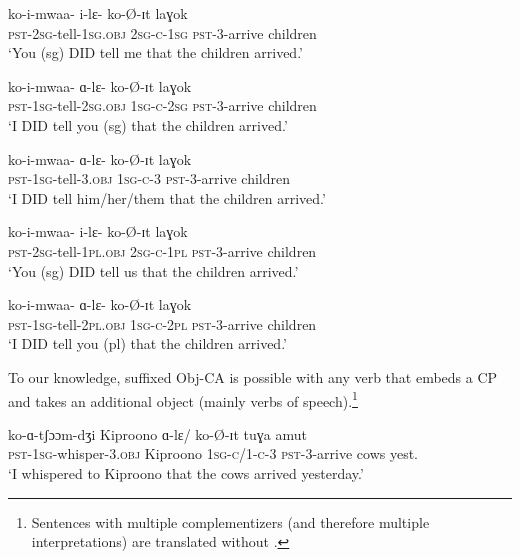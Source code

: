 \documentclass[output=paper
,newtxmath
,modfonts
,nonflat]{langsci/langscibook}
\begin{document}
\ea \label{Obj CA Examples} 
\begin{xlist}

\ex \gll ko-i-mwaa- i-lɛ- ko-\O-ɪt laɣok \\
\textsc{pst}-2\textsc{sg}-tell-1\textsc{sg}.\textsc{obj} 2\textsc{sg-c-}1\textsc{sg} \textsc{pst}-3-arrive children \\ 
\glt `You (sg) DID tell me that the children arrived.'

\ex \gll ko-i-mwaa- ɑ-lɛ- ko-\O-ɪt laɣok \\
\textsc{pst}-1\textsc{sg}-tell-2\textsc{sg}.\textsc{obj} 1\textsc{sg-c-}2\textsc{sg} \textsc{pst}-3-arrive children \\
\glt `I DID tell you (sg) that the children arrived.'

\ex \gll ko-i-mwaa- ɑ-lɛ- ko-\O-ɪt laɣok \\
\textsc{pst}-1\textsc{sg}-tell-3.\textsc{obj} 1\textsc{sg-c}-3 \textsc{pst}-3-arrive children \\
\glt `I DID tell him/her/them that the children arrived.'

\ex \gll ko-i-mwaa- i-lɛ- ko-\O-ɪt laɣok \\
\textsc{pst}-2\textsc{sg}-tell-1\textsc{pl}.\textsc{obj} 2\textsc{sg-c-}1\textsc{pl} \textsc{pst}-3-arrive children \\
\glt `You (sg) DID tell us that the children arrived.'

\ex \gll ko-i-mwaa- ɑ-lɛ- ko-\O-ɪt laɣok \\
\textsc{pst}-1\textsc{sg}-tell-2\textsc{pl}.\textsc{obj} 1\textsc{sg-c-}2\textsc{pl} \textsc{pst}-3-arrive children \\
\glt `I DID tell you (pl) that the children arrived.'

\end{xlist}
\z

\noindent To our knowledge, suffixed Obj-CA is possible with any verb that embeds a CP and takes an additional object (mainly verbs of speech).\footnote{Sentences with multiple complementizers (and therefore multiple interpretations) are translated without .} 

\ea 
\gll ko-ɑ-tʃɔɔm-dʒi Kiproono ɑ-lɛ/ ko-\O-ɪt tuɣa amut \\
\textsc{pst}-1\textsc{sg}-whisper-3.\textsc{obj} Kiproono 1\textsc{sg-c/}1\textsc{-c}-3 \textsc{pst}-3-arrive cows yest. \\
\glt `I whispered to Kiproono that the cows arrived yesterday.' 
\z
\end{document}
